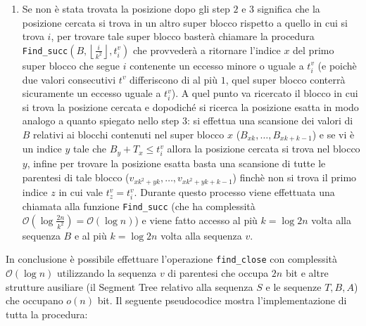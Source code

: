 \documentclass{article}
\begin{document}
\begin{enumerate}
        \item Se non è stata trovata la posizione dopo gli step $2$ e $3$ significa che la posizione cercata si trova in un altro super blocco rispetto a quello in cui si trova $i$, per trovare tale super blocco basterà chiamare la procedura \texttt{Find\_succ}$(B,\left\lfloor{\frac{i}{k^2}}\right\rfloor,t^v_i)$ che provvederà a ritornare l'indice $x$ del primo super blocco che segue $i$ contenente un eccesso minore o uguale a $t^v_i$ (e poichè due valori consecutivi $t^v$ differiscono di al più $1$, quel super blocco conterrà sicuramente un eccesso uguale a $t^v_i$). A quel punto va ricercato il blocco in cui si trova la posizione cercata e dopodiché si ricerca la posizione esatta in modo analogo a quanto spiegato nello step $3$: si effettua una scansione dei valori di $B$ relativi ai blocchi contenuti nel super blocco $x$ ($B_{xk},\dots,B_{xk+k-1}$) e se vi è un indice $y$ tale che $B_y+T_x \leq t^v_i$ allora la posizione cercata si trova nel blocco $y$, infine per trovare la posizione esatta basta una scansione di tutte le parentesi di tale blocco ($v_{xk^2+yk},\dots,v_{xk^2+yk+k-1}$) finchè non si trova il primo indice $z$ in cui vale $t^v_z=t^v_i$. Durante questo processo viene effettuata una chiamata alla funzione \texttt{Find\_succ} (che ha complessità $\mathcal{O}(\log{\frac{2n}{k^2}})=\mathcal{O}(\log{n})$) e viene fatto accesso al più $k=\log 2n$ volta alla sequenza $B$ e al più $k=\log 2n$ volta alla sequenza $v$.
    \end{enumerate}
In conclusione è possibile effettuare l'operazione \texttt{find\_close} con complessità $\mathcal{O}(\log{n})$ utilizzando la sequenza $v$ di parentesi che occupa $2n$ bit e altre strutture ausiliare (il Segment Tree relativo alla sequenza $S$ e le sequenze $T,B,A$) che occupano $o(n)$ bit. Il seguente pseudocodice mostra l'implementazione di tutta la procedura:
\end{document}
